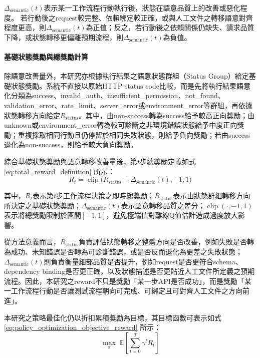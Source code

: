\begin{ZhChapter}
$\Delta_{\text{semantic}}(t)$表示某一工作流程行動執行後，狀態在語意品質上的改善或惡化程度。
若行動後之request較完整、依賴綁定較正確，或與人工文件之轉移語意對齊程度更高，則$\Delta_{\text{semantic}}(t)$為正值；反之，若行動後之依賴關係仍缺失、請求品質下降，或狀態轉移更偏離預期流程，則$\Delta_{\text{semantic}}(t)$為負值。
\paragraph{基礎狀態獎勵與總獎勵計算}
\text 除語意改善量外，本研究亦根據執行結果之語意狀態群組（Status Group）給定基礎狀態獎勵。系統不直接以原始HTTP status code比較，而是先將執行結果語意化分類為success、invalid\_auth、insufficient\_permission、not\_found、validation\_error、rate\_limit、server\_error或environment\_error等群組，再依據狀態轉移方向給定$R_{\text{status}}$。其中，由non-success轉為success給予較高正向獎勵；由unknown或environment\_error轉為較可診斷之非環境錯誤狀態給予中度正向獎勵；重複採取相同行動且仍停留於相同失敗狀態，則給予負向獎勵；若由success退化為non-success，則給予較大負向獎勵。

\text 綜合基礎狀態獎勵與語意轉移改善量後，第$t$步總獎勵定義如式 \eqref{eq:total_reward_definition} 所示：
\begin{equation}
\label{eq:total_reward_definition}
R_t=
\operatorname{clip}
\Big(
R_{\text{status}}+\Delta_{\text{semantic}}(t),
-1,1
\Big)
\end{equation}

\text 其中，$R_t$表示第$t$步工作流程決策之即時總獎勵；$R_{\text{status}}$表示由狀態群組轉移方向所決定之基礎狀態獎勵；$\Delta_{\text{semantic}}(t)$表示語意轉移品質之差分；$\operatorname{clip}(\cdot,-1,1)$表示將總獎勵限制於區間$[-1,1]$，避免極端值對離線Q值估計造成過度放大影響。

\text 從方法意義而言，$R_{\text{status}}$負責評估狀態轉移之整體方向是否改善，例如失敗是否轉為成功、未知錯誤是否轉為可診斷錯誤，或是否反而退化為更差之失敗狀態；$\Delta_{\text{semantic}}(t)$則負責衡量細部品質是否提升，例如request是否更符合schema、dependency binding是否更正確，以及狀態描述是否更貼近人工文件所定義之預期流程。因此，本研究之reward不只是獎勵「某一步API是否成功」，而是獎勵「某一工作流程行動是否讓測試流程朝向可完成、可綁定且可對齊人工文件之方向前進」。

\text 本研究之策略最佳化仍以折扣累積獎勵為目標，其目標函數可表示如式 \eqref{eq:policy_optimization_objective_reward} 所示：
\begin{equation}
\label{eq:policy_optimization_objective_reward}
\max_{\pi}\;
\mathbb{E}
\left[
\sum_{t=0}^{T}\gamma^t R_t
\right]
\end{equation}


\end{ZhChapter}
